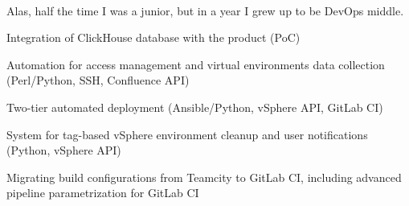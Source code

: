 \documentclass[a4paper]{MagicalCV}
\begin{document}
\begin{minipage}[t]{0.64\textwidth}
 \\
\vspace{\topsep} %
Alas, half the time I was a junior, but in a year I grew up to be DevOps middle.
\begin{tightemize}
  \item Integration of ClickHouse database with the product (PoC)
  \item Automation for access management and virtual environments data collection (Perl/Python, SSH, Confluence API)
  \item Two-tier automated deployment (Ansible/Python, vSphere API, GitLab CI)
  \item System for tag-based vSphere environment cleanup and user notifications (Python, vSphere API)
  \item Migrating build configurations from Teamcity to GitLab CI, including advanced pipeline parametrization for GitLab CI
\end{tightemize}
\sectionsep

\end{minipage} 
\end{document}
